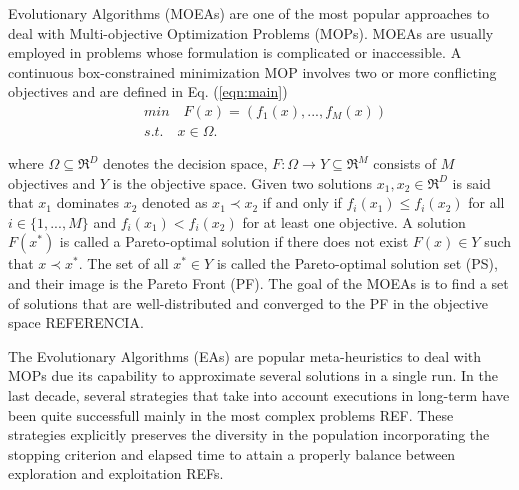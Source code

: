  Evolutionary Algorithms (MOEAs) are one of the most popular approaches to deal with Multi-objective Optimization Problems (MOPs).
%
MOEAs are usually employed in problems whose formulation is complicated or inaccessible.
%
A continuous box-constrained minimization MOP involves two or more conflicting objectives and are defined in Eq. (\ref{eqn:main})
\begin{equation}\label{eqn:main}
\begin{split}
&min \quad F(x) = (f_1(x), ..., f_M(x)) \\
&s.t. \quad x \in \Omega.
\end{split}
\end{equation}

where $\Omega \subseteq \Re^D$ denotes the decision space, $F: \Omega \rightarrow Y \subseteq \Re^M$ consists of $M$ objectives and $Y$ is the objective space.
%
Given two solutions $x_1, x_2 \in \Re^D$ is said that $x_1$ dominates $x_2$ denoted as $x_1 \prec x_2$ if and only if $f_i(x_1) \leq f_i(x_2)$ for all $i \in \{1,...,M\}$ and $f_i(x_1) < f_i(x_2)$ for at least one objective.
%
%
A solution $F(x^*)$ is called a Pareto-optimal solution if there does not exist $F(x) \in Y$ such that $x \prec x^*$.
%
The set of all $x^* \in Y$ is called the Pareto-optimal solution set (PS), and their image is the Pareto Front (PF).
%
The goal of the MOEAs is to find a set of solutions that are well-distributed and converged to the PF in the objective space REFERENCIA.
%

The Evolutionary Algorithms (EAs) are popular meta-heuristics to deal with MOPs due its capability to approximate several solutions in a single run.
%
In the last decade, several strategies that take into account executions in long-term have been quite successfull mainly in the most complex problems REF.
%
These strategies explicitly preserves the diversity in the population incorporating the stopping criterion and elapsed time to attain a properly balance between exploration and exploitation REFs.
%

